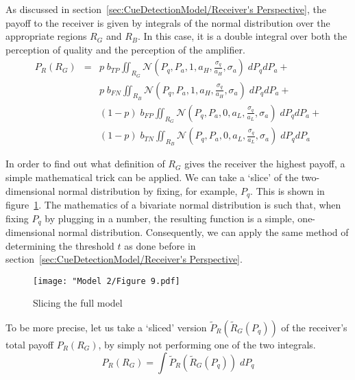\documentclass[a4paper,12pt]{article}
\numberwithin{equation}{section}
\begin{document}
As discussed in section~\ref{sec:CueDetectionModel/Receiver's Perspective}, the payoff to the receiver is given by integrals of the normal distribution over the appropriate regions $R_{G}$ and $R_{B}$. In this case, it is a double integral over both the perception of quality and the perception of the amplifier.
\begin{equation}
\label{eq:CueDetectionModelwithObservableAmplification/PayoffR}
\begin{array}{rcl}
P_{R}(R_{G}) &=& p \; b_{TP} \displaystyle \iint_{R_{G}} \mathcal{N}(P_{q}, P_{a}, 1, a_{H}, \frac{\sigma_{q}}{a_{H}}, \sigma_{a}) \; dP_{q}dP_{a} +\\
&&p \; b_{FN} \displaystyle \iint_{R_{B}} \mathcal{N}(P_{q}, P_{a}, 1, a_{H}, \frac{\sigma_{q}}{a_{H}}, \sigma_{a}) \; dP_{q}dP_{a} +\\
&&(1-p) \; b_{FP} \displaystyle \iint_{R_{G}} \mathcal{N}(P_{q}, P_{a}, 0, a_{L}, \frac{\sigma_{q}}{a_{L}}, \sigma_{a}) \; dP_{q}dP_{a} +\\
&&(1-p) \; b_{TN} \displaystyle \iint_{R_{B}} \mathcal{N}(P_{q}, P_{a}, 0, a_{L}, \frac{\sigma_{q}}{a_{L}}, \sigma_{a}) \; dP_{q}dP_{a}
\end{array}
\end{equation}

In order to find out what definition of $R_{G}$ gives the receiver the highest payoff, a simple mathematical trick can be applied. We can take a `slice' of the two-dimensional normal distribution by fixing, for example, $P_{q}$. This is shown in figure~\ref{fig:Model 2/Figure 9.pdf}. The mathematics of a bivariate normal distribution is such that, when fixing $P_{q}$ by plugging in a number, the resulting function is a simple, one-dimensional normal distribution. Consequently, we can apply the same method of determining the threshold $t$ as done before in section~\ref{sec:CueDetectionModel/Receiver's Perspective}.

\begin{figure}[!h]
\begin{center}
\leavevmode
\texttt{[image: "Model 2/Figure 9.pdf]}
\caption{Slicing the full model}
\label{fig:Model 2/Figure 9.pdf}
\end{center}
\end{figure}

To be more precise, let us take a `sliced' version $\tilde{P}_{R}(\tilde{R}_{G}(P_{q}))$ of the receiver's total payoff $P_{R}(R_{G})$, by simply not performing one of the two integrals.
\begin{equation}
\label{eq:CueDetectionModelwithObservableAmplification/SlicedPayoffR}
P_{R}(R_{G}) = \displaystyle \int \tilde{P}_{R}(\tilde{R}_{G}(P_{q})) \; dP_{q}
\end{equation}
\end{document}
